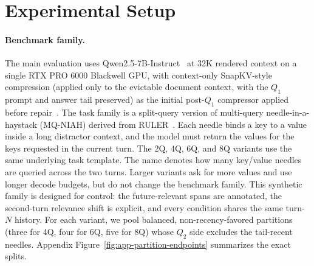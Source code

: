 \documentclass{article}
\begin{document}
\section{Experimental Setup}
\label{sec:setup}

\paragraph{Benchmark family.}
The main evaluation uses Qwen2.5-7B-Instruct~\citep{qwen} at 32K
rendered context on a single RTX PRO 6000 Blackwell GPU, with
context-only SnapKV-style compression (applied
only to the evictable document context, with the $Q_1$ prompt and answer
tail preserved) as the initial post-$Q_1$ compressor applied before
repair~\citep{snapkv}.
The task family is a split-query version of multi-query
needle-in-a-haystack (MQ-NIAH) derived from RULER~\citep{ruler}.
Each needle binds a key to a value inside a long distractor context, and
the model must return the values for the keys requested in the current
turn.
The 2Q, 4Q, 6Q, and 8Q variants use the same underlying task template.
The name denotes how many key/value needles are queried across the two
turns.
Larger variants ask for more values and use longer decode budgets, but
do not change the benchmark family.
This synthetic family is designed for control: the
future-relevant spans are annotated, the second-turn relevance shift is
explicit, and every condition shares the same turn-$N$ history.
For each variant, we pool balanced, non-recency-favored partitions
(three for 4Q, four for 6Q, five for 8Q) whose
$Q_2$ side excludes the tail-recent needles.
Appendix
Figure~\ref{fig:app-partition-endpoints} summarizes the exact splits.
\end{document}
